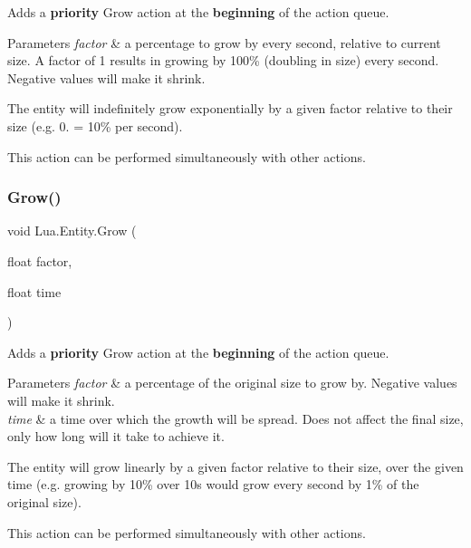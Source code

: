 Adds a {\bfseries{priority}} Grow action at the {\bfseries{beginning}} of the action queue. 


\begin{DoxyParams}{Parameters}
{\em factor} & a percentage to grow by every second, relative to current size. A factor of 1 results in growing by 100\% (doubling in size) every second. Negative values will make it shrink.\\
\hline
\end{DoxyParams}
The entity will indefinitely grow exponentially by a given factor relative to their size (e.\+g. 0. = 10\% per second).

This action can be performed simultaneously with other actions. \mbox{\label{class_lua_1_1_entity_ac574fce9abb6f90e7f7675be74838964}} 
\subsubsection{\texorpdfstring{Grow()}{Grow()}\hspace{0.1cm}{\footnotesize\ttfamily [2/2]}}
{\footnotesize\ttfamily void Lua.\+Entity.\+Grow (\begin{DoxyParamCaption}\item[{float}]{factor,  }\item[{float}]{time }\end{DoxyParamCaption})}



Adds a {\bfseries{priority}} Grow action at the {\bfseries{beginning}} of the action queue. 


\begin{DoxyParams}{Parameters}
{\em factor} & a percentage of the original size to grow by. Negative values will make it shrink.\\
\hline
{\em time} & a time over which the growth will be spread. Does not affect the final size, only how long will it take to achieve it.\\
\hline
\end{DoxyParams}
The entity will grow linearly by a given factor relative to their size, over the given time (e.\+g. growing by 10\% over 10s would grow every second by 1\% of the original size).

This action can be performed simultaneously with other actions. \mbox{\label{class_lua_1_1_entity_a0007133219ff5ec24e9eecf6a9d2dd50}} 
